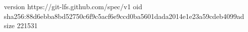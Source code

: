 version https://git-lfs.github.com/spec/v1
oid sha256:88d6ebba8bd52750c6f9c5acf6e9ccd0ba5601dada2014e1e23a59cdeb4099ad
size 221531
